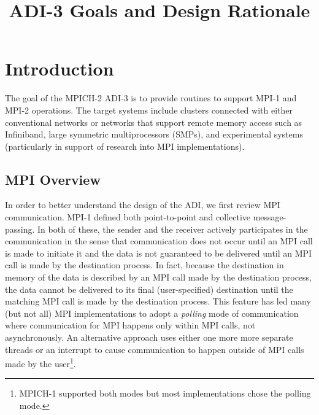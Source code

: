 \documentclass{article}
\begin{document}
\title{ADI-3 Goals and Design Rationale}
\author{}
\maketitle

\begin{abstract}

\end{abstract}

\section{Introduction}
The goal of the MPICH-2 ADI-3 is to provide routines to support MPI-1
and MPI-2 operations.  The target systems include clusters connected
with either conventional networks or networks that support remote
memory access such as Infiniband, large symmetric multiprocessors
(SMPs), and experimental systems (particularly in support of research
into MPI implementations).  

\subsection{MPI Overview}
In order to better understand the design of the ADI, we first review
MPI communication.  MPI-1 defined both point-to-point and collective
message-passing.  In both of these, the sender and the receiver
actively participates in the communication in the sense that
communication does not occur until an MPI call is made to initiate it
and the data is not guaranteed to be delivered until an MPI call is
made by the destination process.  In fact, because the destination in memory of
the data is described by an MPI call made by the destination process, the
data cannot be delivered to its final (user-specified) destination
until the matching MPI call is made by the destination process.  This feature
has led many (but not all) MPI implementations to adopt a
\emph{polling} mode of communication where communication for MPI
happens only within MPI calls, not asynchronously.  An alternative
approach uses either one more more separate threads or an interrupt to
cause communication to happen outside of MPI calls made by the
user\footnote{MPICH-1 supported both modes but most implementations chose the
  polling mode.}.
\end{document}
